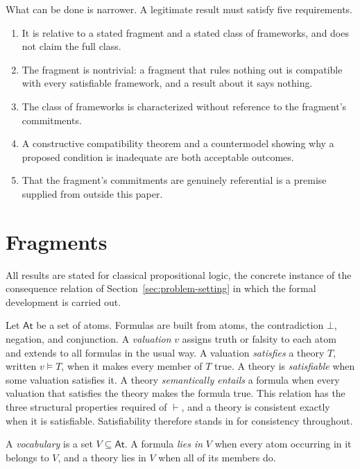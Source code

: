 \documentclass[11pt]{article}
\theoremstyle{plain}
\theoremstyle{definition}
\theoremstyle{remark}
\newcommand{\SecRef}[1]{Section~\ref{#1}}
\newcommand{\entails}{\vdash}
\begin{document}
What can be done is narrower.
A legitimate result must satisfy five requirements.
\begin{enumerate}
  \item It is relative to a stated fragment and a stated class of frameworks,
        and does not claim the full class.
  \item The fragment is nontrivial: a fragment that rules nothing out is
        compatible with every satisfiable framework, and a result about it
        says nothing.
  \item The class of frameworks is characterized without reference to the
        fragment's commitments.
  \item A constructive compatibility theorem and a countermodel showing why a
        proposed condition is inadequate are both acceptable outcomes.
  \item That the fragment's commitments are genuinely referential is a premise
        supplied from outside this paper.
\end{enumerate}



\section{Fragments}
\label{sec:fragments}

All results are stated for classical propositional logic, the concrete
instance of the consequence relation of \SecRef{sec:problem-setting} in which
the formal development is carried out.

Let $\mathsf{At}$ be a set of atoms.
Formulas are built from atoms, the contradiction $\bot$, negation, and
conjunction.
A \emph{valuation} $v$ assigns truth or falsity to each atom and extends to all
formulas in the usual way.
A valuation \emph{satisfies} a theory $T$, written $v \models T$, when it makes
every member of $T$ true.
A theory is \emph{satisfiable} when some valuation satisfies it.
A theory \emph{semantically entails} a formula when every valuation that
satisfies the theory makes the formula true.
This relation has the three structural properties required of $\entails$, and a
theory is consistent exactly when it is satisfiable.
Satisfiability therefore stands in for consistency throughout.

A \emph{vocabulary} is a set $V \subseteq \mathsf{At}$.
A formula \emph{lies in} $V$ when every atom occurring in it belongs to $V$,
and a theory lies in $V$ when all of its members do.
\end{document}

